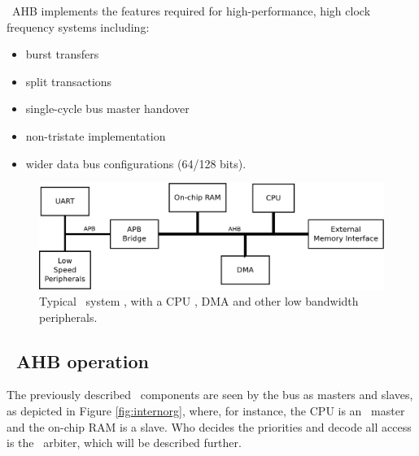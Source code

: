 \amba~AHB implements the features required for high-performance, high clock
frequency systems including:
\begin{itemize}
 \item {burst transfers}
\item {split transactions}
\item {single-cycle bus master handover}
\item {non-tristate implementation}
\item {wider data bus configurations (64/128 bits).}
\end{itemize}

 \begin{figure}[!ht]
    \centering
    \includegraphics[width=1\textwidth]{figures/pdf/typical_amba_new.pdf}
    \caption{Typical \amba~system , with a CPU , DMA and other low bandwidth peripherals. }
    \label{fig:general}
\end{figure}
\subsection{\amba~AHB operation}


The previously described \amba~components are seen by the bus as masters and slaves, as depicted in Figure \ref{fig:internorg}, where, for instance, the CPU is an \amba~master and the on-chip RAM is a slave. Who decides the priorities and decode all access is the \amba~arbiter, which will be described further.

